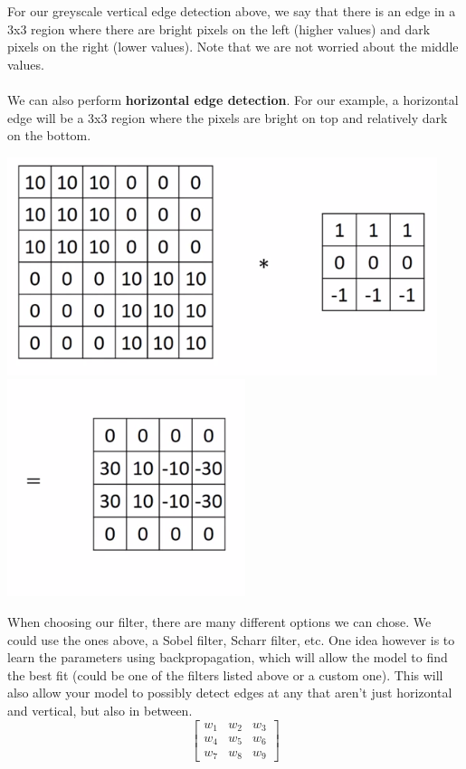 \documentclass[11pt, a4paper]{article}
\begin{document}
\begin{spacing}{1.1}
\begin{center}
	\end{center}
	For our greyscale vertical edge detection above, we say that there is an edge in a 3x3 region where there are bright pixels on the left (higher values) and dark pixels on the right (lower values). Note that we are not worried about the middle values. \\~\\
	We can also perform \textbf{horizontal edge detection}. For our example, a horizontal edge will be a 3x3 region where the pixels are bright on top and relatively dark on the bottom.
	\begin{center}
	\includegraphics[scale=.5]{horizontal} \includegraphics[scale=.5]{horizontal_2}	
	\end{center}
	When choosing our filter, there are many different options we can chose. We could use the ones above, a Sobel filter, Scharr filter, etc. One idea however is to learn the parameters using backpropagation, which will allow the model to find the best fit (could be one of the filters listed above or a custom one). This will also allow your model to possibly detect edges at any that aren't just horizontal and vertical, but also in between. $$ \begin{bmatrix}
	w_1 & w_2 & w_3 \\ w_4 & w_5 & w_6 \\ w_7 & w_8 & w_9 \end{bmatrix} $$ \newpage


\end{spacing}
\end{document}
